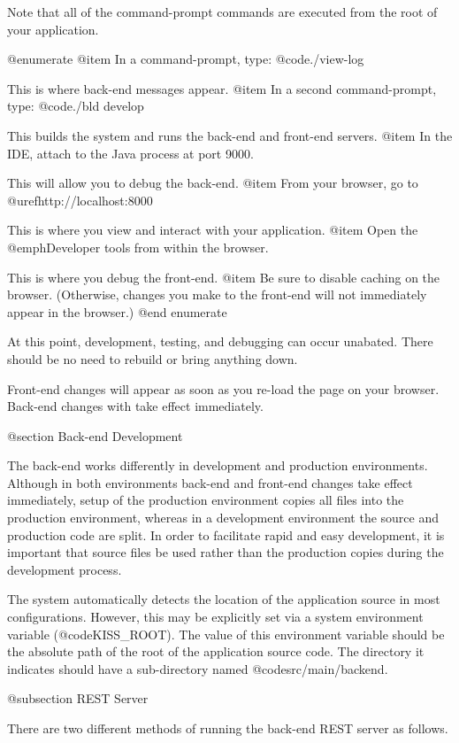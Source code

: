 Note that all of the command-prompt commands are executed from the
root of your application.

@enumerate
@item
In a command-prompt, type:  @code{./view-log}

This is where back-end messages appear.
@item
In a second command-prompt, type:  @code{./bld develop}

This builds the system and runs the back-end and front-end servers.
@item
In the IDE, attach to the Java process at port 9000.

This will allow you to debug the back-end.
@item
From your browser, go to @uref{http://localhost:8000}

This is where you view and interact with your application.
@item
Open the @emph{Developer tools} from within the browser.

This is where you debug the front-end.
@item
Be sure to disable caching on the browser. (Otherwise, changes you make to 
the front-end will not immediately appear in the browser.)
@end enumerate

At this point, development, testing, and debugging can occur unabated.
There should be no need to rebuild or bring anything down.

Front-end changes will appear as soon as you re-load the page on your browser.
Back-end changes with take effect immediately.

@section Back-end Development

The back-end works differently in development and production
environments.  Although in both environments back-end and front-end
changes take effect immediately, setup of the production environment
copies all files into the production environment, whereas in a
development environment the source and production code are split.  In
order to facilitate rapid and easy development, it is important that
source files be used rather than the production copies during the
development process.  

The system automatically detects the location of the application
source in most configurations.  However, this may be explicitly
set via a system environment variable (@code{KISS_ROOT}).  The
value of this environment variable should be the absolute path of the
root of the application source code.  The directory it indicates
should have a sub-directory named @code{src/main/backend}.



@subsection REST Server

There are two different methods of running the back-end REST server as
follows.


